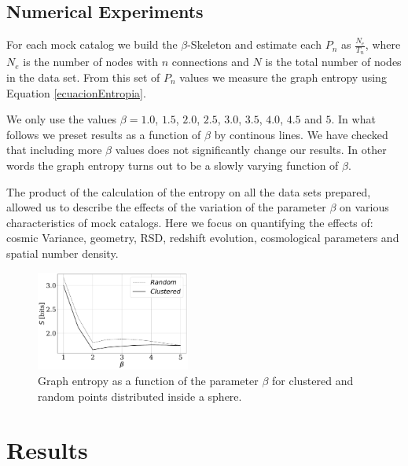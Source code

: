 \documentclass[fleqn,usenatbib]{mnras}
\begin{document}
\subsection{Numerical Experiments}

For each mock catalog we build the $\beta$-Skeleton and estimate each $P_n$ as  $\frac{N_e}{T_n}$, where $N_e$ is the number of nodes with $n$ connections and $N$ is the
total number of nodes in the data set.
From this set of $P_n$ values we measure the graph entropy using Equation \ref{ecuacionEntropia}.

We only use the values $\beta=1.0$, $1.5$, $2.0$, $2.5$, $3.0$, $3.5$, $4.0$, $4.5$ and $5$.
In what follows we preset results as a function of $\beta$ by continous lines.
We have checked that including more $\beta$ values does not significantly change
our results. 
In other words the graph entropy turns out to be a slowly varying function of $\beta$.


The product of the calculation of the entropy on all the data sets prepared, allowed us to
describe the effects of the variation of the parameter $\beta$ on various characteristics
of mock catalogs. 
Here we focus on quantifying the effects of: cosmic Variance, geometry, RSD, redshift
evolution, cosmological parameters and spatial number density.


\begin{figure}
    \includegraphics[width=0.45\textwidth]{entropy.pdf}
    \caption{Graph entropy as a function of the parameter $\beta$ 
    for clustered and random points distributed inside a sphere. \label{fig:entropy}}
\end{figure}




\section{Results}
\label{sec:results}
\end{document}
